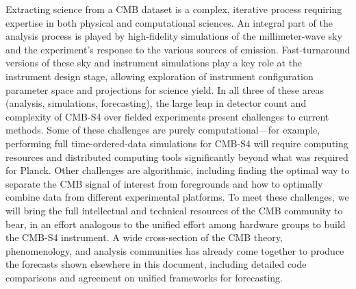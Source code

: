 Extracting science from a CMB dataset is a complex, iterative process requiring expertise in both physical and computational sciences. An integral part of the analysis process is played by high-fidelity simulations of the millimeter-wave sky and the experiment's response to the various sources of emission. Fast-turnaround versions of these sky and instrument simulations play a key role at the instrument design stage, allowing exploration of instrument configuration parameter space and projections for science yield. In all three of these areas (analysis, simulations, forecasting), the large leap in detector count and complexity of CMB-S4 over fielded experiments present challenges to current methods. Some of these challenges are purely computational---for example, performing full time-ordered-data simulations for CMB-S4 will require computing resources and distributed computing tools significantly beyond what was required for Planck. Other challenges are algorithmic, including finding the optimal way to separate the CMB signal of interest from foregrounds and how to optimally combine data from different experimental platforms. To meet these challenges, we will bring the full intellectual and technical resources of the CMB community to bear, in an effort analogous to the unified effort among hardware groups to build the CMB-S4 instrument. A wide cross-section of the CMB theory, phenomenology, and analysis communities has already come together to produce the forecasts shown elsewhere in this document, including detailed code comparisons and agreement on unified frameworks for forecasting.

\eject






 
